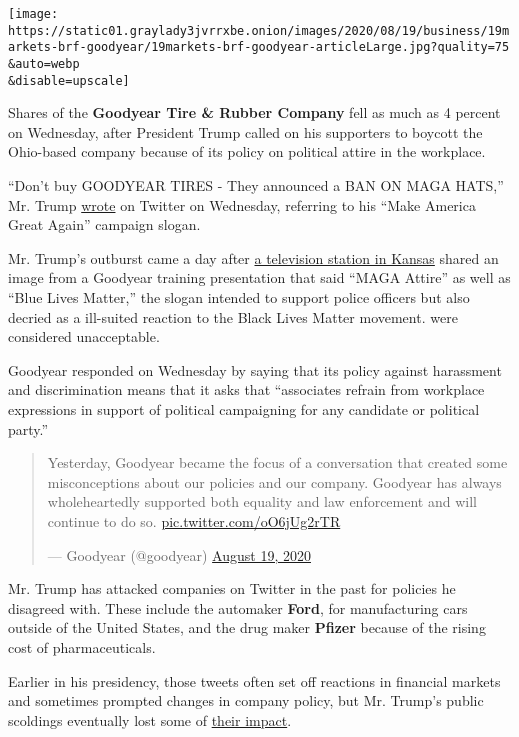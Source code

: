 \texttt{[image: https://static01.graylady3jvrrxbe.onion/images/2020/08/19/business/19markets-brf-goodyear/19markets-brf-goodyear-articleLarge.jpg?quality=75\\\&auto=webp\\\&disable=upscale]}

Shares of the \textbf{Goodyear Tire \& Rubber Company} fell as much as 4
percent on Wednesday, after President Trump called on his supporters to
boycott the Ohio-based company because of its policy on political attire
in the workplace.

``Don't buy GOODYEAR TIRES - They announced a BAN ON MAGA HATS,'' Mr.
Trump
\href{https://twitter.com/realDonaldTrump/status/1296092859226042368?s=20}{wrote}
on Twitter on Wednesday, referring to his ``Make America Great Again''
campaign slogan.

Mr. Trump's outburst came a day after
\href{https://www.wibw.com/2020/08/18/goodyear-employees-say-new-no-tolerance-policy-is-discriminatory/}{a
television station in Kansas} shared an image from a Goodyear training
presentation that said ``MAGA Attire'' as well as ``Blue Lives Matter,''
the slogan intended to support police officers but also decried as a
ill-suited reaction to the Black Lives Matter movement. were considered
unacceptable.

Goodyear responded on Wednesday by saying that its policy against
harassment and discrimination means that it asks that ``associates
refrain from workplace expressions in support of political campaigning
for any candidate or political party.''

\begin{quote}
Yesterday, Goodyear became the focus of a conversation that created some
misconceptions about our policies and our company. Goodyear has always
wholeheartedly supported both equality and law enforcement and will
continue to do so.
\href{https://t.co/oO6jUg2rTR}{pic.twitter.com/oO6jUg2rTR}

--- Goodyear (@goodyear)
\href{https://twitter.com/goodyear/status/1296111292827283462?ref_src=twsrc\%5Etfw}{August
19, 2020}
\end{quote}

Mr. Trump has attacked companies on Twitter in the past for policies he
disagreed with. These include the automaker \textbf{Ford}, for
manufacturing cars outside of the United States, and the drug maker
\textbf{Pfizer} because of the rising cost of pharmaceuticals.

Earlier in his presidency, those tweets often set off reactions in
financial markets and sometimes prompted changes in company policy, but
Mr. Trump's public scoldings eventually lost some of
\href{https://www.nytimes3xbfgragh.onion/2019/03/20/us/politics/trump-twitter-businesses.html}{their
impact}.

